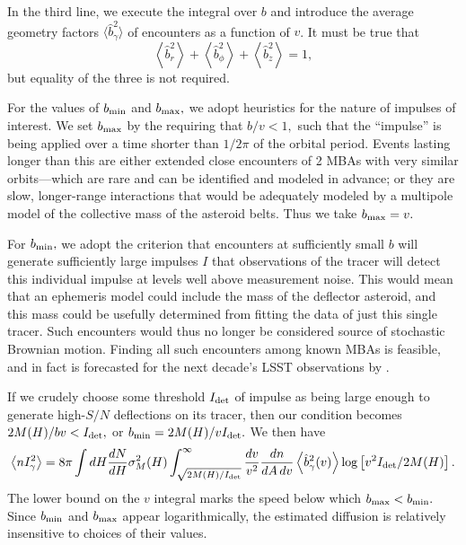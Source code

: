\documentclass[linenumbers, onecolumn]{aastex631}
\begin{document}
In the third line, we execute the integral over $b$ and introduce the
average geometry factors $\langle \hat b^2_\gamma\rangle$ of encounters as
a function of $v$.  It must be true that
\begin{equation}
  \left\langle \hat b_r^2 \right\rangle
  + \left\langle \hat b_\phi^2 \right\rangle
  + \left\langle \hat b_z^2 \right\rangle = 1,
\end{equation}
but equality of the three is not required.

For the values of $b_{\rm min}$ and $b_{\rm max},$ we adopt heuristics
for the nature of impulses of interest.  We set $b_{\rm max}$ by the
requiring that $b/v<1,$ such that the ``impulse'' is being applied
over a time shorter than $1/2\pi$ of the orbital period.  Events
lasting longer than this are either extended close encounters of 2
MBAs with very similar orbits---which are rare and can be identified
and modeled in advance; or they are slow, longer-range interactions
that would be adequately modeled by a multipole model of the
collective mass of the asteroid belts.  Thus we take $b_{\rm max}=v.$

For $b_{\rm min},$ we adopt the criterion that encounters at
sufficiently small $b$ will generate sufficiently large impulses $I$
that observations of the tracer will detect this individual impulse at
levels well above measurement noise.  This would mean that an
ephemeris model could include the mass of the deflector asteroid, and
this mass could be usefully determined from fitting the data of just this
single tracer.
Such encounters would thus no longer be considered source of
stochastic Brownian motion.  Finding all such encounters among known
MBAs is feasible, and in fact is forecasted for the next decade's LSST
observations by
\citet{negin}. 

If we crudely choose some threshold
$I_{\rm det}$ of impulse as being large enough to generate high-$S/N$
deflections on its tracer, then our condition becomes $2M(H)/bv <
I_{\rm det},$ or $b_{\rm min}=2M(H)/vI_{\rm det}.$  We then have
\begin{equation}
   \left\langle n I_\gamma^2 \right\rangle = 
8\pi \int dH \frac{dN}{dH} \sigma^2_M(H)  \int_{\sqrt{2M(H)/I_{\rm
      det}}}^\infty \frac{dv}{v^2} 
        \frac{dn}{dA\,dv}  \left\langle\hat b_\gamma^2(v)\right\rangle
        \log \left[v^2 I_{\rm det}/2M(H)\right].
        \label{eq:nI2}
      \end{equation}
The lower bound on the $v$ integral marks the speed below which
$b_{\rm max}<b_{\rm min}.$  Since $b_{\rm min}$ and $b_{\rm max}$
appear logarithmically, the estimated diffusion is relatively insensitive to choices of
their values.
\end{document}
